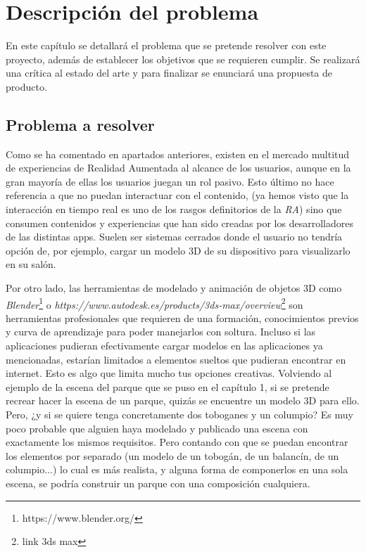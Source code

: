 \chapter{Descripción del problema}

En este capítulo se detallará el problema que se pretende resolver con este proyecto, además de establecer los objetivos que se requieren cumplir. Se realizará una crítica al estado del arte y para finalizar se enunciará una propuesta de producto.

\section{Problema a resolver}
Como se ha comentado en apartados anteriores, existen en el mercado multitud de experiencias de Realidad Aumentada al alcance de los usuarios, aunque en la gran mayoría de ellas los usuarios juegan un rol pasivo. Esto último no hace referencia a que no puedan interactuar con el contenido, (ya hemos visto que la interacción en tiempo real es uno de los rasgos definitorios de la \textit{RA}) sino que consumen contenidos y experiencias que han sido creadas por los desarrolladores de las distintas apps. Suelen ser sistemas cerrados donde el usuario no tendría opción de, por ejemplo, cargar un modelo 3D de su dispositivo para visualizarlo en su salón.

Por otro lado, las herramientas de modelado y animación de objetos 3D como \textit{Blender}\footnote{https://www.blender.org/} o \textit{https://www.autodesk.es/products/3ds-max/overview}\footnote{link 3ds max} son herramientas profesionales que requieren de una formación, conocimientos previos y curva de aprendizaje para poder manejarlos con soltura. Incluso si las aplicaciones pudieran efectivamente cargar modelos en las aplicaciones ya mencionadas, estarían limitados a elementos sueltos que pudieran encontrar en internet. Esto es algo que limita mucho tus opciones creativas. Volviendo al ejemplo de la escena del parque que se puso en el capítulo 1, si se pretende recrear hacer la escena de un parque, quizás se encuentre un modelo 3D para ello. Pero, ¿y si se quiere tenga concretamente dos toboganes y un columpio? Es muy poco probable que alguien haya modelado y publicado una escena con exactamente los mismos requisitos. Pero contando con que se puedan encontrar los elementos por separado (un modelo de un tobogán, de un balancín, de un columpio...) lo cual es más realista, y alguna forma de componerlos en una sola escena, se podría construir un parque con una composición cualquiera.

